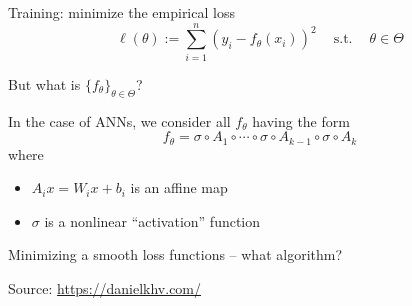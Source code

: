 \documentclass[
    xcolor={svgnames,dvipsnames},
    hyperref={colorlinks, citecolor=DeepPink4, linkcolor=DarkRed, urlcolor=DarkBlue}
    ]{beamer}  %
\newcommand{\st}{\ensuremath{\ \mathrm{s.t.}\ }}
\newcommand{\1}{\mathbbm 1}
\begin{document}
\begin{frame}

    Training: minimize the empirical loss
    \begin{equation*}
        \ell(\theta) := \sum_{i=1}^n (y_i - f_\theta(x_i))^2
        \quad \st \quad \theta \in \Theta
    \end{equation*}


    \pause
    But what is $\{f_\theta\}_{\theta \in \Theta}$?

    \pause
    \vspace{0.5em}
    In the case of ANNs, we consider all $f_\theta$ having the form
    \begin{equation*}
        f_\theta
        = \sigma \circ A_{1} 
            \circ \cdots \circ \sigma \circ A_{k-1}  \circ \sigma \circ A_{k}
    \end{equation*}
    where
    \begin{itemize}
        \item $A_{i} x = W_i x + b_i $ is an affine map 
        \vspace{0.5em}
        \item $\sigma$ is a nonlinear ``activation'' function
    \end{itemize}

\end{frame}


\begin{frame}
    

    Minimizing a smooth loss functions  -- what algorithm?
    
    \begin{figure}
       \begin{center}
       \end{center}
    \end{figure}

    Source: \url{https://danielkhv.com/}

\end{frame}
\end{document}
